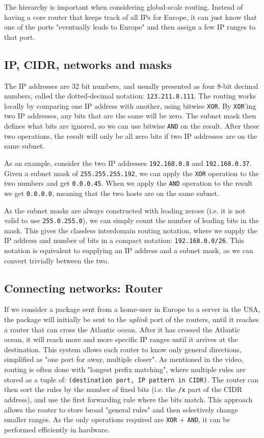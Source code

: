 The hierarchy is important when considering global-scale routing. Instead of having a core router that keeps track of all IPs for Europe, it can just know that one of the ports "eventually leads to Europe" and then assign a few IP ranges to that port.

\subsection{IP, CIDR, networks and masks}
The IP addresses are 32 bit numbers, and usually presented as four 8-bit decimal numbers, called the dotted-decimal notation: \texttt{123.211.8.111}. The routing works locally by comparing one IP address with another, using bitwise \texttt{XOR}. By \texttt{XOR}'ing two IP addresses, any bits that are the same will be zero. The subnet mask then defines what bits are ignored, so we can use bitwise \texttt{AND} on the result. After these two operations, the result will only be all zero bits if two IP addresses are on the same subnet.

As an example, consider the two IP addresses \texttt{192.168.0.8} and \texttt{192.168.0.37}. Given a subnet mask of \texttt{255.255.255.192}, we can apply the \texttt{XOR} operation to the two numbers and get \texttt{0.0.0.45}. When we apply the \texttt{AND} operation to the result we get \texttt{0.0.0.0}, meaning that the two hosts are on the same subnet.

As the subnet masks are always constructed with leading zeroes (i.e. it is not valid to use \texttt{255.0.255.0}), we can simply count the number of leading bits in the mask. This gives the classless interdomain routing notation, where we supply the IP address and number of bits in a compact notation: \texttt{192.168.0.0/26}. This notation is equivalent to supplying an IP address and a subnet mask, as we can convert trivially between the two.

\subsection{Connecting networks: Router}
If we consider a package sent from a home-user in Europe to a server in the USA, the package will initially be sent to the \emph{uplink} port of the routers, until it reaches a router that can cross the Atlantic ocean. After it has crossed the Atlantic ocean, it will reach more and more specific IP ranges until it arrives at the destination. This system allows each router to know only general directions, simplified as "one port for away, multiple closer". As mentioned in the video, routing is often done with "longest prefix matching", where multiple rules are stored as a tuple of: \texttt{(destination port, IP pattern in CIDR)}. The router can then sort the rules by the number of fixed bits (i.e. the \texttt{/x} part of the CIDR address), and use the first forwarding rule where the bits match. This approach allows the router to store broad "general rules" and then selectively change smaller ranges. As the only operations required are \texttt{XOR} + \texttt{AND}, it can be performed efficiently in hardware.

